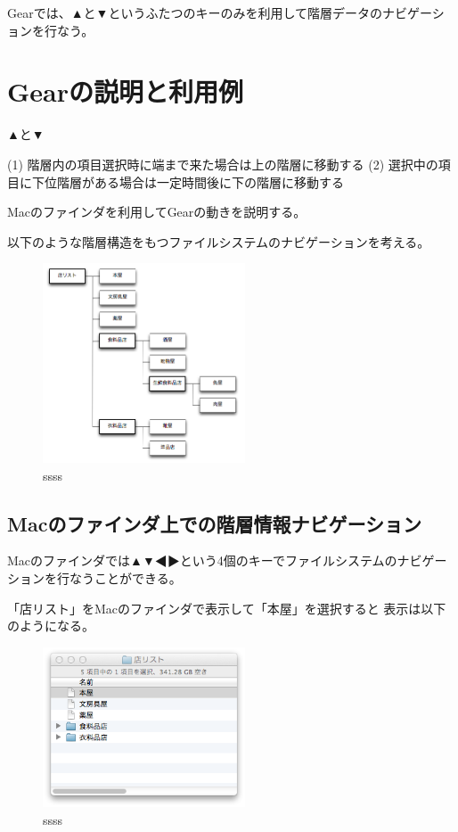 \documentclass[twoside]{wiss}
\begin{document}
Gearでは、▲と▼というふたつのキーのみを利用して階層データのナビゲーションを行なう。

\section{Gearの説明と利用例}

▲と▼

(1) 階層内の項目選択時に端まで来た場合は上の階層に移動する
(2) 選択中の項目に下位階層がある場合は一定時間後に下の階層に移動する

Macのファインダを利用してGearの動きを説明する。

以下のような階層構造をもつファイルシステムのナビゲーションを考える。

\begin{figure}[H]
\centerline{\includegraphics[width=60mm,bb=0 0 509 502]{figures/ae9216b00626f9c4eea44cc380f25886.png}}
\caption{ssss}
\label{screenshot}
\end{figure}

\subsection*{Macのファインダ上での階層情報ナビゲーション}

Macのファインダでは▲▼◀▶という4個のキーでファイルシステムのナビゲーションを行なうことができる。

「店リスト」をMacのファインダで表示して「本屋」を選択すると
表示は以下のようになる。

\begin{figure}[H]
\centerline{\includegraphics[width=60mm,bb=0 0 344 272]{figures/9b121bec45e5b480e5ac64fdd0f82592.png}}
\caption{ssss}
\label{screenshot}
\end{figure}
\end{document}
